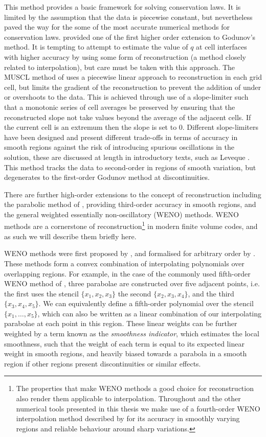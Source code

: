 This method provides a basic framework for solving conservation laws.
It is limited by the assumption that the data is piecewise constant, but nevertheless paved the way for the some of the most accurate numerical methods for conservation laws.
\citet{VanLeer1979} provided one of the first higher order extension to Godunov's method.
It is tempting to attempt to estimate the value of $q$ at cell interfaces with higher accuracy by using some form of reconstruction (a method closely related to interpolation), but care must be taken with this approach.
The MUSCL method of \citet{VanLeer1979} uses a piecewise linear approach to reconstruction in each grid cell, but limits the gradient of the reconstruction to prevent the addition of under or overshoots to the data.
This is achieved through use of a slope-limiter such that a monotonic series of cell averages be preserved by ensuring that the reconstructed slope not take values beyond the average of the adjacent cells.
If the current cell is an extremum then the slope is set to 0.
Different slope-limiters have been designed and present different trade-offs in terms of accuracy in smooth regions against the risk of introducing spurious oscillations in the solution, these are discussed at length in introductory texts, such as Leveque \NeedRef{}.
This method tracks the data to second-order in regions of smooth variation, but degenerates to the first-order Godunov method at discontinuities.

There are further high-order extensions to the concept of reconstruction including the parabolic method of \citet{Colella1984}, providing third-order accuracy in smooth regions, and the general weighted essentially non-oscillatory (WENO) methods.
WENO methods are a cornerstone of reconstruction\footnote{The properties that make WENO methods a good choice for reconstruction also render them applicable to interpolation. Throughout \Lw{} and the other numerical tools presented in this thesis we make use of a fourth-order WENO interpolation method described by \citet{Janett2019} for its accuracy in smoothly varying regions and reliable behaviour around sharp variations.} in modern finite volume codes, and as such we will describe them briefly here.

WENO methods were first proposed by \citet{Liu1994}, and formalised for arbitrary order by \citet{Jiang1996}.
These methods form a convex combination of interpolating polynomials over overlapping regions.
For example, in the case of the commonly used fifth-order WENO method of \citet{Jiang1996}, three parabolae are constructed over five adjacent points, i.e. the first uses the stencil $\{x_1, x_2, x_3\}$ the second $\{x_2, x_3, x_4\}$, and the third $\{x_3, x_4, x_5\}$.
We can equivalently define a fifth-order polynomial over the stencil $\{x_1, \ldots, x_5\}$, which can also be written as a linear combination of our interpolating parabolae at each point in this region.
These linear weights can be further weighted by a term known as the \emph{smoothness indicator}, which estimates the local smoothness, such that the weight of each term is equal to its expected linear weight in smooth regions, and heavily biased towards a parabola in a smooth region if other regions present discontinuities or similar effects.

